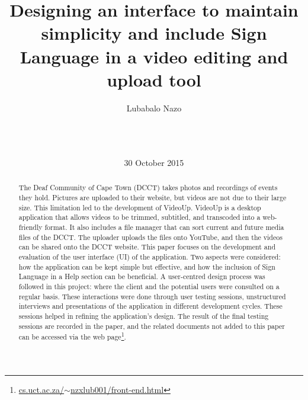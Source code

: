 \documentclass{sig-alternate-05-2015}
\begin{document}

\title{Designing an interface to maintain simplicity and include Sign Language in a video editing and upload tool}


\author{
\alignauthor
        Lubabalo Nazo\\
        \\
        \\
        \\
}
\date{30 October 2015}

\maketitle
\begin{abstract}
The Deaf Community of Cape Town (DCCT) takes photos and recordings of events they hold. Pictures are uploaded to their website, but videos are not due to their large size. This limitation led to the development of VideoUp. VideoUp is a desktop application that allows videos to be trimmed, subtitled, and transcoded into a web-friendly format. It also includes a file manager that can sort current and future media files of the DCCT. The uploader uploads the files onto YouTube, and then the videos can be shared onto the DCCT website. This paper focuses on the development and evaluation of the user interface (UI) of the application. Two aspects were considered: how the application can be kept simple but effective, and how the inclusion of Sign Language in a Help section can be beneficial. A user-centred design process was followed in this project: where the client and the potential users were consulted on a regular basis. These interactions were done through user testing sessions, unstructured interviews and presentations of the application in different development cycles. These sessions helped in refining the application’s design. The result of the final testing sessions are recorded in the paper, and the related documents not added to this paper can be accessed via the web page\footnote{\href{http://people.cs.uct.ac.za/~nzxlub001/front-end.html}{cs.uct.ac.za/$\sim$nzxlub001/front-end.html}}.
\end{abstract}

%
%
\printccsdesc

\end{document}

